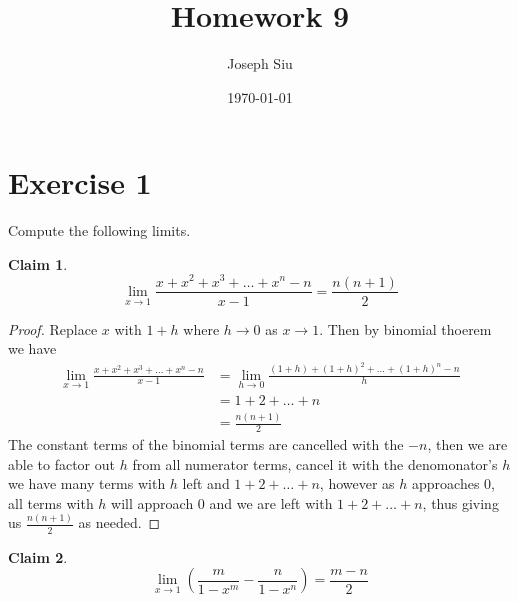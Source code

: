 \documentclass{homework}
\author{Joseph Siu}
\date{\today}
\title{Homework 9}
\newcommand{\ra}{\rightarrow}
\newcommand{\?}{\stackrel{?}{=}}
\theoremstyle{definition}
\newtheorem*{claim}{Claim}
\begin{document}
 \maketitle

\section*{Exercise 1}

Compute the following limits.

\question[1] 

\begin{claim}
\[\lim_{x\to1}\frac{x+x^2+x^3+\ldots+x^n-n}{x-1}=\frac{n(n+1)}{2}\]
\end{claim}

\begin{proof}
    Replace $x$ with $1+h$ where $h\to0$ as $x\to1$. Then by binomial thoerem we have \begin{align*}
        \lim_{x\to1}\frac{x+x^2+x^3+\ldots+x^n-n}{x-1}&=\lim_{h\to0}\frac{(1+h)+(1+h)^2+\ldots+(1+h)^n-n}{h}\\
        &=1+2+\ldots+n\\
        &=\frac{n(n+1)}{2}
    \end{align*} 
    The constant terms of the binomial terms are cancelled with the $-n$, then we are able to factor out $h$ from all numerator terms, cancel it with the denomonator's $h$ we have many terms with $h$ left and $1+2+\ldots+n$, however as $h$ approaches $0$, all terms with $h$ will approach $0$ and we are left with $1+2+\ldots+n$, thus giving us $\frac{n(n+1)}{2}$ as needed.
\end{proof}

\question[2] 

\begin{claim}
    \[\lim_{x\ra1}\left( \frac{m}{1-x^m}-\frac{n}{1-x^n} \right)=\frac{m-n}{2}\]
\end{claim}
\end{document}
